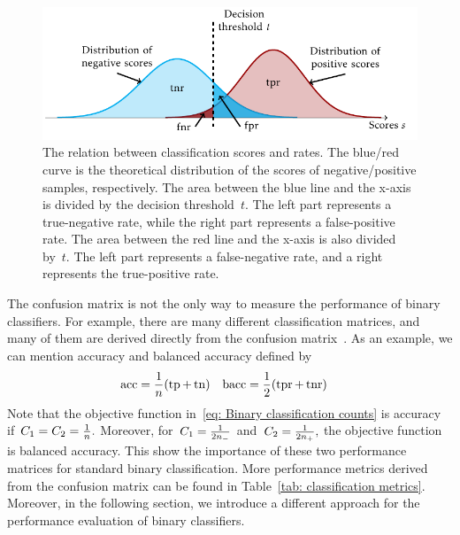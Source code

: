 \begin{figure}
  \centering
  \includegraphics{images/confusion_rates.pdf}
  \caption{The relation between classification scores and  rates. The blue/red curve is the theoretical distribution of the scores of negative/positive samples, respectively. The area between the blue line and the x-axis is divided by the decision threshold~$t.$ The left part represents a true-negative rate, while the right part represents a false-positive rate. The area between the red line and the x-axis is also divided by~$t.$ The left part represents a false-negative rate, and a right represents the true-positive rate.}
  \label{fig: scores and rates}
\end{figure}

The confusion matrix is not the only way to measure the performance of binary classifiers. For example, there are many different classification matrices, and many of them are derived directly from the confusion matrix~\cite{fawcett2006introduction, metz1978basic, brodersen2010balanced, hossin2015review}. As an example, we can mention accuracy and balanced accuracy defined by
\begin{align*}
  \accuracy & = \frac{1}{n}\Brac{\tp + \tn} &
  \baccuracy & = \frac{1}{2}\Brac{\tpr + \tnr}
\end{align*}
Note that the objective function in~\eqref{eq: Binary classification counts} is accuracy if~$C_1 = C_2 = \frac{1}{n}.$ Moreover, for~$C_1 = \frac{1}{2n_{-}}$ and~$C_2 = \frac{1}{2n_{+}},$ the objective function is balanced accuracy. This show the importance of these two performance matrices for standard binary classification. More performance metrics derived from the confusion matrix can be found in Table~\ref{tab: classification metrics}. Moreover, in the following section, we introduce a different approach for the performance evaluation of binary classifiers.

